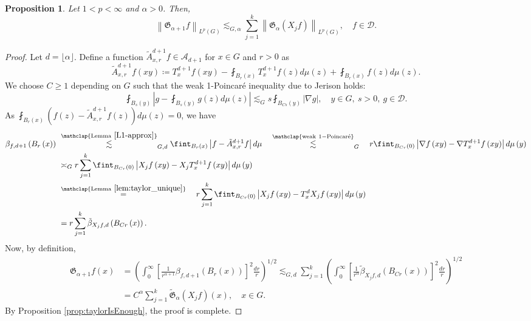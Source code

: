 \documentclass[11pt,reqno]{amsart}
\newtheorem{proposition}[theorem]{Proposition}
\newcommand{\1}{\mathbf 1}
\begin{document}
\begin{proposition}\label{prop:g_alpha_induct}
Let $1 < p < \infty$ and $ \alpha>0 $. Then,
\[
\left\|\mathfrak{G}_{\alpha + 1}f\right\|_{L^p\left(G\right)} \lesssim_{G,\alpha} \sum_{j=1}^k \left\|\mathfrak{G}_{\alpha}\left(X_jf\right)\right\|_{L^p\left(G\right)}, \quad f \in \mathcal{D}. 
\]
\end{proposition}
\begin{proof}
Let $d=\lfloor\alpha\rfloor$. Define a function $\tilde{A}^{d+1}_{x,r}f \in {\mathcal{A}}_{d+1}$ for $x\in G$ and $r>0$ as
\[
\tilde{A}^{d+1}_{x,r}f\left(xy\right)\coloneqq T^{d+1}_xf\left(xy\right)-\fint_{B_r\left(x\right)} T^{d+1}_xf\left(z\right)d\mu\left(z\right)+\fint_{B_r\left(x\right)} f\left(z\right)d\mu\left(z\right).
\]
We choose $C\ge 1$ depending on $G$ such that the weak 1-Poincar\'e inequality due to Jerison \cite{jerison1986poincare} holds:
\[
\fint_{B_s\left(y\right)}\left|g-\fint_{B_s\left(y\right)} g\left(z\right)d\mu\left(z\right)\right|\lesssim_G s\fint_{B_{Cs}\left(y\right)} \left|\nabla g\right|,\quad y\in G, ~s>0,~g\in \mathcal{D}.
\]
As $\fint_{B_r\left(x\right)} \left(f\left(z\right)-\tilde{A}^{d+1}_{x,r}f\left(z\right)\right)d\mu\left(z\right)=0$, we have
\begin{align*}
    \beta_{f,d +1}\left(B_r\left(x\right)\right)~&\stackrel{\mathclap{\mathrm{Lemma }~\ref{L1-approx}}}{\lesssim}_{G,d} \fint_{B_r\left(x\right)}\left|f-\tilde{A}^{d+1}_{x,r}f\right|d\mu \quad\stackrel{\mathclap{\mathrm{weak~1-Poincar\acute{e}}}}{\lesssim}_G \quad r\fint_{B_{Cr}\left(0\right)}\left|\nabla f\left(xy\right)-\nabla T^{d+1}_xf\left(xy\right)\right|d\mu\left(y\right)\\
    &\asymp_G r\sum_{j=1}^k \fint_{B_{Cr}\left(0\right)}\left|X_jf\left(xy\right)-X_jT^{d+1}_xf\left(xy\right)\right|d\mu\left(y\right)\\
&\stackrel{\mathclap{\mathrm{Lemma~}\ref{lem:taylor_unique}}}{=}\quad r\sum_{j=1}^k \fint_{B_{Cr}\left(0\right)}\left|X_jf\left(xy\right)-T^d_xX_jf\left(xy\right)\right|d\mu\left(y\right)\\
&=r\sum_{j=1}^k \tilde{\beta}_{X_jf,d}\left(B_{Cr}\left(x\right)\right).
\end{align*}
Now, by definition,
\begin{align*}
\mathfrak{G}_{\alpha+1}f\left(x\right)&=\left(\int_0^\infty \left[\frac{1}{r^{\alpha+1}}\beta_{f,d+1}\left(B_r\left(x\right)\right)\right]^2\frac{dr}{r}\right)^{1/2}\lesssim_{G,d} \sum_{j=1}^k\left(\int_0^\infty \left[\frac{1}{r^\alpha}\tilde{\beta}_{X_jf,d}\left(B_{Cr}\left(x\right)\right)\right]^2\frac{dr}{r}\right)^{1/2}\\
&= C^\alpha \sum_{j=1}^k\tilde{\mathfrak{G}}_\alpha \left(X_jf\right)\left(x\right),\quad x\in G.
\end{align*}
By Proposition \ref{prop:taylorIsEnough}, the proof is complete.
\end{proof}
\end{document}
